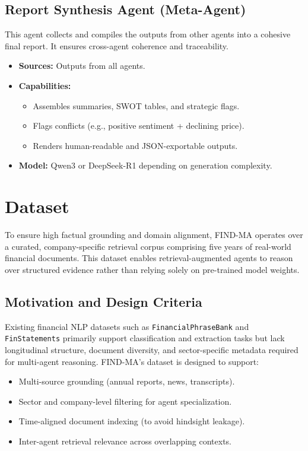 \documentclass[11pt]{article}
\newcommand{\findma}{\textsc{FIND-MA}}
\begin{document}
\subsection*{Report Synthesis Agent (Meta-Agent)}
This agent collects and compiles the outputs from other agents into a cohesive final report. It ensures cross-agent coherence and traceability.
\begin{itemize}
    \item \textbf{Sources:} Outputs from all agents.
    \item \textbf{Capabilities:}
        \begin{itemize}
            \item Assembles summaries, SWOT tables, and strategic flags.
            \item Flags conflicts (e.g., positive sentiment + declining price).
            \item Renders human-readable and JSON-exportable outputs.
        \end{itemize}
    \item \textbf{Model:} Qwen3 or DeepSeek-R1 depending on generation complexity.
\end{itemize}

\section{Dataset}
\label{sec:dataset}
To ensure high factual grounding and domain alignment, \findma{} operates over a curated, company-specific retrieval corpus comprising five years of real-world financial documents. This dataset enables retrieval-augmented agents to reason over structured evidence rather than relying solely on pre-trained model weights.

\subsection*{Motivation and Design Criteria}
Existing financial NLP datasets such as \texttt{FinancialPhraseBank} and \texttt{FinStatements} primarily support classification and extraction tasks but lack longitudinal structure, document diversity, and sector-specific metadata required for multi-agent reasoning. \findma{}’s dataset is designed to support:
\begin{itemize}
    \item Multi-source grounding (annual reports, news, transcripts).
    \item Sector and company-level filtering for agent specialization.
    \item Time-aligned document indexing (to avoid hindsight leakage).
    \item Inter-agent retrieval relevance across overlapping contexts.
\end{itemize}
\end{document}

